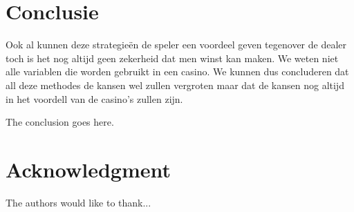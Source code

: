 \documentclass[conference]{IEEEtran}
\begin{document}
\section{Conclusie}
Ook al kunnen deze strategie\"{e}n de speler een voordeel geven tegenover de dealer toch is het nog altijd geen zekerheid dat men winst kan maken. We weten niet alle variablen die worden gebruikt in een casino. We kunnen dus concluderen dat all deze methodes de kansen wel zullen vergroten maar dat de kansen nog altijd in het voordell van de casino's zullen zijn.

The conclusion goes here.

\section*{Acknowledgment}

The authors would like to thank...\cite{2015a}




\end{document}
